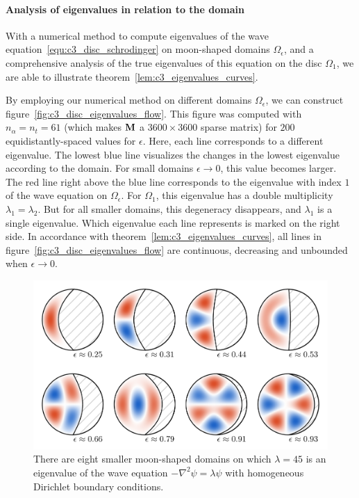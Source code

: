\paragraph{Analysis of eigenvalues in relation to the domain}

With a numerical method to compute eigenvalues of the wave equation~\eqref{equ:c3_disc_schrodinger} on moon-shaped domains $\Omega_\epsilon$, and a comprehensive analysis of the true eigenvalues of this equation on the disc $\Omega_1$, we are able to illustrate theorem~\ref{lem:c3_eigenvalues_curves}.

By employing our numerical method on different domains $\Omega_\epsilon$, we can construct figure~\ref{fig:c3_disc_eigenvalues_flow}. This figure was computed with $n_\alpha = n_t = 61$ (which makes $\vb{M}$ a $3600\times3600$ sparse matrix) for $200$ equidistantly-spaced values for $\epsilon$. Here, each line corresponds to a different eigenvalue. The lowest blue line visualizes the changes in the lowest eigenvalue according to the domain. For small domains $\epsilon \to 0$, this value becomes larger. The red line right above the blue line corresponds to the eigenvalue with index $1$ of the wave equation on $\Omega_\epsilon$. For $\Omega_1$, this eigenvalue has a double multiplicity $\lambda_1 = \lambda_2$. But for all smaller domains, this degeneracy disappears, and $\lambda_1$ is a single eigenvalue. Which eigenvalue each line represents is marked on the right side. In accordance with theorem~\ref{lem:c3_eigenvalues_curves}, all lines in figure~\ref{fig:c3_disc_eigenvalues_flow} are continuous, decreasing and unbounded when $\epsilon \to 0$.


\begin{figure}
  \begin{center}
    \includegraphics[width=\textwidth]{img/chapter3/on_disc/solutions.png}
    \caption{There are eight smaller moon-shaped domains on which $\lambda = 45$ is an eigenvalue of the wave equation $-\nabla^2 \psi = \lambda \psi$ with homogeneous Dirichlet boundary conditions.}
    \label{fig:c3_disc_solutions}
  \end{center}
\end{figure}


